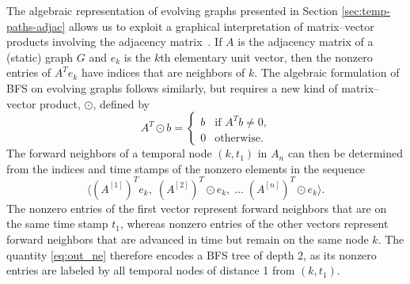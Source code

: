 \documentclass[10pt,conference,compsocconf]{IEEEtran}
\theoremstyle{definition}
\begin{document}
The algebraic representation of evolving graphs presented in Section \ref{sec:temp-paths-adjac}
allows us to exploit a graphical interpretation of
matrix--vector products involving the adjacency matrix~\cite{kegi11}.
If $A$ is the adjacency matrix of a (static) graph $G$ and $e_k$ is the $k$th
elementary unit vector, then the nonzero entries of $A^T e_k$ have indices that
are neighbors of $k$.
The algebraic formulation of BFS on evolving graphs follows similarly, but
requires a new kind of matrix--vector product, $\odot$, defined by
\[
A^T \!\odot b =
\begin{cases}
b & \mbox{if $A^Tb \ne 0$,} \\
0 & \mbox{otherwise.}
\end{cases}
\]
The forward neighbors of a temporal node $(k, t_1)$ in $A_n$ can then be determined
from the indices and time stamps of the nonzero elements in the sequence
\begin{equation}
\label{eq:out_ne}
\big\langle (A^{[1]})^Te_k, \; (A^{[2]})^T\!\odot e_k, \; \ldots \; (A^{[n]})^T\!\odot e_k\big\rangle.
\end{equation}
The nonzero entries of the first vector represent forward neighbors that are on
the same time stamp $t_1$, whereas nonzero entries of the other vectors represent forward
neighbors that are advanced in time but remain on the same node $k$.
The quantity \eqref{eq:out_ne} therefore encodes a BFS tree of depth 2,
as its nonzero entries are labeled by all temporal nodes of distance 1 from
$(k, t_1)$.
\end{document}
